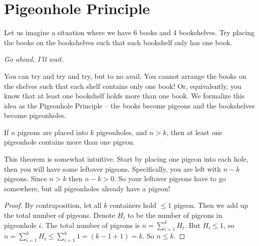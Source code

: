 \documentclass[main.tex]{subfiles}
\begin{document}
\section{Pigeonhole Principle}

Let us imagine a situation where we have 6 books and 4 bookshelves. Try placing the books on the bookshelves such that each bookshelf only has one book.

\begin{center}
	\textit{Go ahead, I'll wait.}
\end{center}

You can try and try and try, but to no avail. You cannot arrange the books on the shelves such that each shelf contains only one book! Or, equivalently, you know that at least one bookshelf holds more than one book. We formalize this idea as the Pigeonhole Principle -- the books become pigeons and the bookshelves become pigeonholes.

\begin{thm}
	If \(n\) pigeons are placed into \(k\) pigeonholes, and \(n > k\), then at least one pigeonhole contains more than one pigeon.
\end{thm}

\begin{rem}
	This theorem is somewhat intuitive. Start by placing one pigeon into each hole, then you will have some leftover pigeons. Specifically, you are left with \(n-k\) pigeons. Since \(n > k\) then \(n-k > 0\). So your leftover pigeons have to go somewhere, but all pigeonholes already have a pigeon!
\end{rem}

\begin{proof}
	By contraposition, let all \(k\) containers hold \(\leq 1\) pigeon. Then we add up the total number of pigeons. Denote \(H_i\) to be the number of pigeons in pigeonhole \(i\). The total number of pigeons is \(n = \sum_{i=1}^{k} H_i\). But \(H_i \leq 1\), so \(n = \sum_{i=1}^{k} H_i \leq \sum_{i=1}^{k} 1 = (k-1+1) = k\). So \(n \leq k\).
\end{proof}

\end{document}
